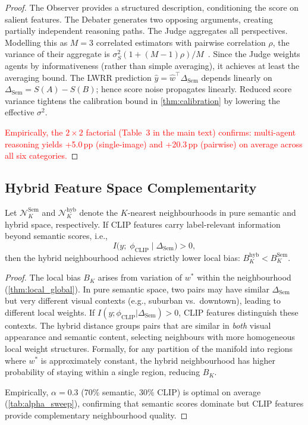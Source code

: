 \documentclass[runningheads]{llncs}
\begin{document}
\begin{proof}
The Observer provides a structured description, conditioning the score on salient features.
The Debater generates two opposing arguments, creating partially independent reasoning paths.
The Judge aggregates all perspectives.
Modelling this as $M{=}3$ correlated estimators with pairwise correlation $\rho$, the variance of their aggregate is $\sigma_S^2(1+(M{-}1)\rho)/M$~\cite{wang2023selfconsistency}.
Since the Judge weights agents by informativeness (rather than simple averaging), it achieves at least the averaging bound.
The LWRR prediction $\hat{y} = \hat{w}^{\!\top}\Delta_{\text{Sem}}$ depends linearly on $\Delta_{\text{Sem}} = S(A){-}S(B)$; hence score noise propagates linearly.
Reduced score variance tightens the calibration bound in \cref{thm:calibration} by lowering the effective $\sigma^2$.

\textcolor{red}{Empirically, the $2{\times}2$ factorial (Table~3 in the main text) confirms: multi-agent reasoning yields +5.0\,pp (single-image) and +20.3\,pp (pairwise) on average across all six categories.}
\end{proof}

\subsection{Hybrid Feature Space Complementarity}
\label{sec:theory_hybrid}

\begin{proposition}\label{prop:hybrid}
Let $\mathcal{N}_K^{\mathrm{Sem}}$ and $\mathcal{N}_K^{\mathrm{hyb}}$ denote the $K$-nearest neighbourhoods in pure semantic and hybrid space, respectively.
If CLIP features carry label-relevant information beyond semantic scores, i.e.,
\begin{equation}
I\bigl(y;\;\phi_{\mathrm{CLIP}} \;\big|\; \Delta_{\mathrm{Sem}}\bigr) > 0,
\label{eq:cmi}
\end{equation}
then the hybrid neighbourhood achieves strictly lower local bias: $B_K^{\mathrm{hyb}} < B_K^{\mathrm{Sem}}$.
\end{proposition}

\begin{proof}
The local bias $B_K$ arises from variation of $w^{*}$ within the neighbourhood (\cref{thm:local_global}).
In pure semantic space, two pairs may have similar $\Delta_{\text{Sem}}$ but very different visual contexts (e.g., suburban vs.\ downtown), leading to different local weights.
If $I(y;\phi_{\text{CLIP}}|\Delta_{\text{Sem}}) > 0$, CLIP features distinguish these contexts.
The hybrid distance groups pairs that are similar in \emph{both} visual appearance and semantic content, selecting neighbours with more homogeneous local weight structures.
Formally, for any partition of the manifold into regions where $w^{*}$ is approximately constant, the hybrid neighbourhood has higher probability of staying within a single region, reducing $B_K$.

Empirically, $\alpha{=}0.3$ (70\% semantic, 30\% CLIP) is optimal on average (\cref{tab:alpha_sweep}), confirming that semantic scores dominate but CLIP features provide complementary neighbourhood quality.
\end{proof}
\end{document}
